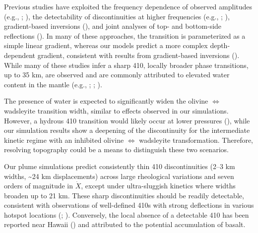 \documentclass[
  paper=a4,
  ,captions=tableheading
]{scrartcl}
\begin{document}
Previous studies have exploited the frequency dependence of observed
amplitudes (e.g., ; ), the
detectability of discontinuities at higher frequencies (e.g.,
; ), gradient-based inversions
(), and joint analyses of
top- and bottom-side reflections (). In many of these approaches, the transition is
parameterized as a simple linear gradient, whereas our models predict a
more complex depth-dependent gradient, consistent with results from
gradient-based inversions ().
While many of these studies infer a sharp 410, locally broader phase
transitions, up to 35 km, are observed and are commonly attributed to
elevated water content in the mantle (e.g.,
;
;
).

The presence of water is expected to significantly widen the olivine
\(\Leftrightarrow\) wadsleyite transition width, similar to effects
observed in our simulations. However, a hydrous 410 transition would
likely occur at lower pressures (), while our simulation results show a deepening of the
discontinuity for the intermediate kinetic regime with an inhibited
olivine \(\Leftrightarrow\) wadsleyite transformation. Therefore,
resolving topography could be a means to distinguish these two
scenarios.

Our plume simulations predict consistently thin 410 discontinuities
(2--3 km widths, \textasciitilde24 km displacements) across large
rheological variations and seven orders of magnitude in \(\dot{X}\),
except under ultra-sluggish kinetics where widths broaden up to 21 km.
These sharp discontinuities should be readily detectable, consistent
with observations of well-defined 410s with strong deflections in
various hotspot locations (;
). Conversely, the
local absence of a detectable 410 has been reported near Hawaii
() and attributed to the
potential accumulation of basalt.
\end{document}
